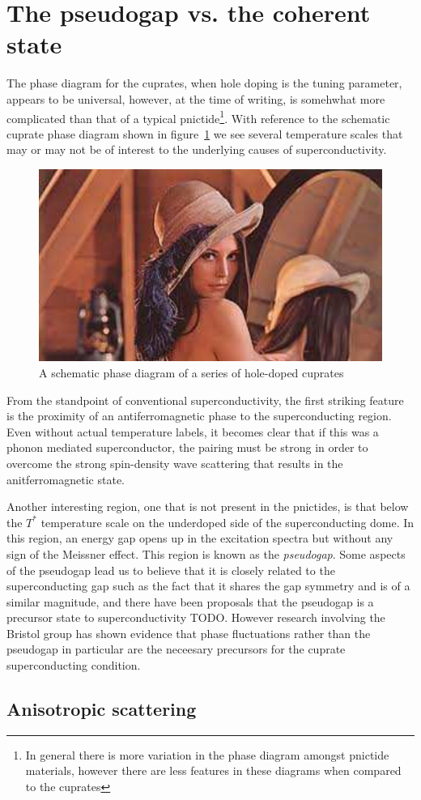 
\section{The pseudogap vs. the coherent state}

The phase diagram for the cuprates, when hole doping is the tuning parameter, appears to be universal, however, at the time of writing, is somehwhat more complicated than that of a typical pnictide\footnote{In general there is more variation in the phase diagram amongst pnictide materials, however there are less features in these diagrams when compared to the cuprates}. With reference to the schematic cuprate phase diagram shown in figure~\ref{Fig:Intro:UniversalCupratePhaseDiagram} we see several temperature scales that may or may not be of interest to the underlying causes of \highTc superconductivity.
\begin{figure}[htbp]
    \begin{center}
        \includegraphics[scale=0.7]{Misc/TODO}
        \caption{A schematic phase diagram of a series of hole-doped cuprates}
        \label{Fig:Intro:UniversalCupratePhaseDiagram}
    \end{center}
\end{figure}
From the standpoint of conventional superconductivity, the first striking feature is the proximity of an antiferromagnetic phase to the superconducting region. Even without actual temperature labels, it becomes clear that if this was a phonon mediated superconductor, the pairing must be strong in order to overcome the strong spin-density wave scattering that results in the anitferromagnetic state.

Another interesting region, one that is not present in the pnictides, is that below the $T^*$ temperature scale on the underdoped side of the superconducting dome. In this region, an energy gap opens up in the excitation spectra but without any sign of the Meissner effect. This region is known as the \textit{pseudogap}. Some aspects of the pseudogap lead us to believe that it is closely related to the superconducting gap such as the fact that it shares the gap symmetry and is of a similar magnitude, and there have been proposals that the pseudogap is a precursor state to superconductivity TODO. However research involving the Bristol group has shown evidence that phase fluctuations rather than the pseudogap in particular are the neceesary precursors for the cuprate superconducting condition\cite{Rourke2011}.

\subsection{Anisotropic scattering}


